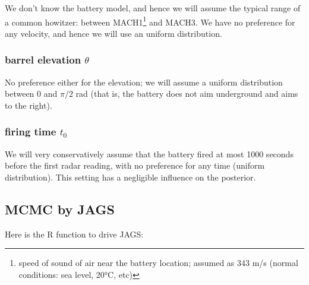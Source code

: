 \documentclass[]{article}
\begin{document}
We don't know the battery model, and hence we will assume the typical
range of a common howitzer: between MACH1\footnote{speed of sound of air
  near the battery location; assumed as 343 m/s (normal conditions: sea
  level, 20°C, etc)} and MACH3. We have no preference for any velocity,
and hence we will use an uniform distribution.

\hypertarget{barrel-elevation-theta}{%
\subsubsection{\texorpdfstring{barrel elevation
\(\theta\)}{barrel elevation \textbackslash{}theta}}\label{barrel-elevation-theta}}

No preference either for the elevation; we will assume a uniform
distribution between 0 and \(\pi/2\) rad (that is, the battery does not
aim underground and aims to the right).

\hypertarget{firing-time-t_0}{%
\subsubsection{\texorpdfstring{firing time
\(t_0\)}{firing time t\_0}}\label{firing-time-t_0}}

We will very conservatively assume that the battery fired at most 1000
seconds before the first radar reading, with no preference for any time
(uniform distribution). This setting has a negligible influence on the
posterior.

\hypertarget{mcmc-by-jags}{%
\subsection{MCMC by JAGS}\label{mcmc-by-jags}}

Here is the R function to drive JAGS:
\end{document}
